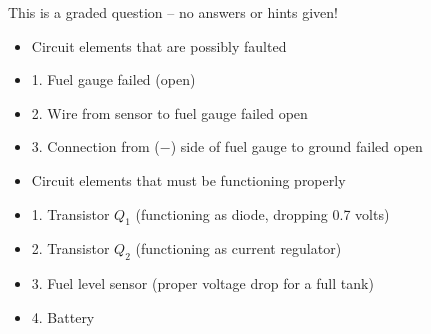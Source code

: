 This is a graded question -- no answers or hints given!







\begin{itemize}
\item{} Circuit elements that are possibly faulted
\item{1.} Fuel gauge failed (open)
\item{2.} Wire from sensor to fuel gauge failed open
\item{3.} Connection from ($-$) side of fuel gauge to ground failed open
\end{itemize}

\begin{itemize}
\item{} Circuit elements that must be functioning properly
\item{1.} Transistor $Q_1$ (functioning as diode, dropping 0.7 volts)
\item{2.} Transistor $Q_2$ (functioning as current regulator)
\item{3.} Fuel level sensor (proper voltage drop for a full tank)
\item{4.} Battery
\end{itemize}




